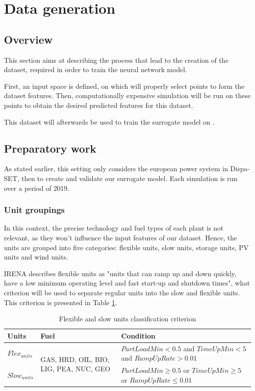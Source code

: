 \section{Data generation}

\subsection{Overview}

This section aims at describing the process that lead to the creation of the dataset, required in order to train the neural network model.

First, an input space is defined, on which will properly select points to form the dataset features. Then, computationally expensive simulation will be run on these points to obtain the desired predicted features for this dataset.

This dataset will afterwards be used to train the surrogate model on \cite{surrogate_model}.

\subsection{Preparatory work}

As stated earlier, this setting only considers the european power system in Dispa-SET, then to create and validate our surrogate model. Each simulation is run over a period of 2019.

\subsubsection{Unit groupings}
In this context, the precise technology and fuel types of each plant is not relevant, as they won't influence the input features of our dataset. Hence, the units are grouped into five categories: flexible units, slow units, storage units, PV units and wind units.

IRENA \cite{irena} describes flexible units as "units that can ramp up and down quickly, have a low minimum operating level and fast start-up and shutdown times", what criterion will be used to separate regular units into the slow and flexible units. This criterion is presented in Table \ref{table:flex-vs-slow-unit}.

\begin{table}[h!]
    \centering
	\begin{tabular}{|l | l | p{8cm}|}
		\hline
		Units & Fuel & Condition \\
		\hline
		$Flex_{units}$ & \multirow{2}{3cm}{GAS, HRD, OIL, BIO, LIG, PEA, NUC, GEO} & $PartLoadMin<0.5$ and $TimeUpMin<5$ and $RampUpRate>0.01$\\ \cline{1-1} \cline{3-3}
		$Slow_{units}$ &  & $PartLoadMin\geq 0.5$ or $TimeUpMin \geq 5$ or $RampUpRate\leq 0.01$\\
		\hline
	\end{tabular}
	\caption{Flexible and slow units classification criterion}
	\label{table:flex-vs-slow-unit}
\end{table}

